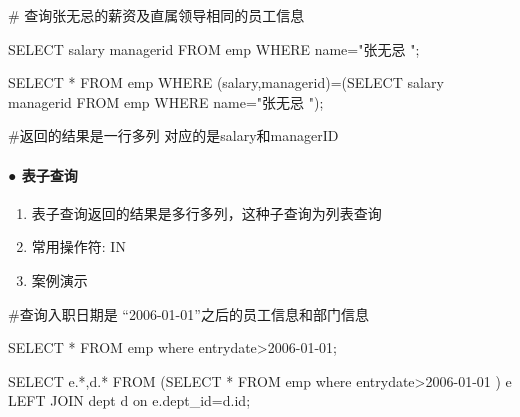\documentclass[
  letterpaper,
  DIV=11,
  numbers=noendperiod]{scrreprt}
\let\oldparagraph\paragraph
\renewcommand{\paragraph}[1]{\oldparagraph{#1}\mbox{}}
\newenvironment{Shaded}{\begin{snugshade}}{\end{snugshade}}
\newcommand{\DecValTok}[1]{\textcolor[rgb]{0.68,0.00,0.00}{#1}}
\newcommand{\KeywordTok}[1]{\textcolor[rgb]{0.00,0.23,0.31}{#1}}
\newcommand{\NormalTok}[1]{\textcolor[rgb]{0.00,0.23,0.31}{#1}}
\newcommand{\OperatorTok}[1]{\textcolor[rgb]{0.37,0.37,0.37}{#1}}
\newcommand{\OtherTok}[1]{\textcolor[rgb]{0.00,0.23,0.31}{#1}}
\newcommand{\StringTok}[1]{\textcolor[rgb]{0.13,0.47,0.30}{#1}}
\providecommand{\tightlist}{%
  \setlength{\itemsep}{0pt}\setlength{\parskip}{0pt}}\usepackage{longtable,booktabs,array}
\begin{document}
\begin{Shaded}
\begin{Highlighting}[]
\NormalTok{\# 查询张无忌的薪资及直属领导相同的员工信息}

\KeywordTok{SELECT}\NormalTok{ salary managerid }\KeywordTok{FROM}\NormalTok{ emp }\KeywordTok{WHERE}\NormalTok{ name}\OperatorTok{=}\OtherTok{"张无忌 "}\NormalTok{;}

\KeywordTok{SELECT} \OperatorTok{*} \KeywordTok{FROM}\NormalTok{ emp }\KeywordTok{WHERE}\NormalTok{ (salary,managerid)}\OperatorTok{=}\NormalTok{(}\KeywordTok{SELECT}\NormalTok{ salary managerid }\KeywordTok{FROM}\NormalTok{ emp }\KeywordTok{WHERE}\NormalTok{ name}\OperatorTok{=}\OtherTok{"张无忌 "}\NormalTok{);}

\NormalTok{\#返回的结果是一行多列 对应的是salary和managerID}
\end{Highlighting}
\end{Shaded}

\hypertarget{ux8868ux5b50ux67e5ux8be2}{%
\paragraph{● 表子查询}\label{ux8868ux5b50ux67e5ux8be2}}

\begin{enumerate}
\def\labelenumi{\arabic{enumi}.}
\tightlist
\item
  表子查询返回的结果是多行多列，这种子查询为列表查询
\item
  常用操作符: IN
\item
  案例演示
\end{enumerate}

\begin{Shaded}
\begin{Highlighting}[]
\NormalTok{\#查询入职日期是 “}\DecValTok{2006}\OperatorTok{{-}}\DecValTok{01}\OperatorTok{{-}}\NormalTok{01”之后的员工信息和部门信息}

\KeywordTok{SELECT} \OperatorTok{*} \KeywordTok{FROM}\NormalTok{ emp }\KeywordTok{where}\NormalTok{ entrydate}\OperatorTok{\textgreater{}}\StringTok{\textquotesingle{}2006{-}01{-}01\textquotesingle{}}\NormalTok{;}

\KeywordTok{SELECT}\NormalTok{ e.}\OperatorTok{*}\NormalTok{,d.}\OperatorTok{*} \KeywordTok{FROM}\NormalTok{ (}\KeywordTok{SELECT} \OperatorTok{*} \KeywordTok{FROM}\NormalTok{ emp }\KeywordTok{where}\NormalTok{ entrydate}\OperatorTok{\textgreater{}}\StringTok{\textquotesingle{}2006{-}01{-}01 \textquotesingle{}}\NormalTok{) e }\KeywordTok{LEFT} \KeywordTok{JOIN}\NormalTok{ dept d }\KeywordTok{on}\NormalTok{ e.dept\_id}\OperatorTok{=}\NormalTok{d.}\KeywordTok{id}\NormalTok{;}
\end{Highlighting}
\end{Shaded}
\end{document}
